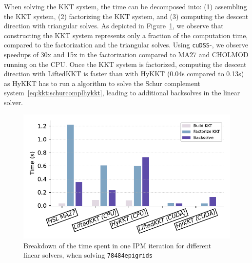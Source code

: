 When solving the KKT system, the time can be decomposed into: (1) assembling the
KKT system, (2) factorizing the KKT system, and (3) computing the descent direction with triangular solves.
As depicted in Figure~\ref{fig:timebreakdown}, we observe
that constructing the KKT system represents only a fraction of the computation time, compared
to the factorization and the triangular solves. Using {\tt cuDSS}-\ldlt, we observe speedups of
30x and 15x in the factorization compared to MA27 and CHOLMOD running on the CPU.
Once the KKT system is factorized, computing the descent direction with LiftedKKT is faster than with HyKKT
(0.04s compared to 0.13s) as HyKKT has to run a \CG algorithm to solve the Schur complement
system~\eqref{eq:kkt:schurcomplhykkt}, leading to additional backsolves
in the linear solver.

\begin{figure}[!ht]
  \centering
  \includegraphics[width=.7\textwidth]{figures/breakdown.pdf}
  \caption{Breakdown of the time spent in one IPM iteration
    for different linear solvers, when solving {\tt 78484epigrids}
  \label{fig:timebreakdown}}
\end{figure}



